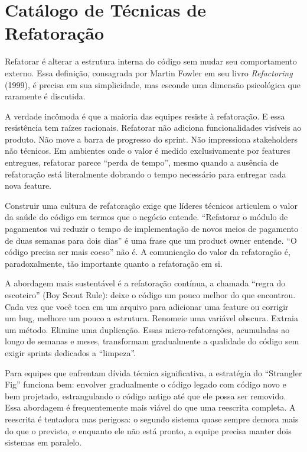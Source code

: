 \section{Catálogo de Técnicas de Refatoração}

Refatorar é alterar a estrutura interna do código sem mudar seu comportamento
externo. Essa definição, consagrada por Martin Fowler em seu livro
\emph{Refactoring} (1999), é precisa em sua simplicidade, mas esconde uma
dimensão psicológica que raramente é discutida.

A verdade incômoda é que a maioria das equipes resiste à refatoração. E essa
resistência tem raízes racionais. Refatorar não adiciona funcionalidades
visíveis ao produto. Não move a barra de progresso do sprint. Não impressiona
stakeholders não técnicos. Em ambientes onde o valor é medido exclusivamente
por features entregues, refatorar parece ``perda de tempo'', mesmo quando
a ausência de refatoração está literalmente dobrando o tempo necessário para
entregar cada nova feature.

Construir uma cultura de refatoração exige que líderes técnicos articulem
o valor da saúde do código em termos que o negócio entende. ``Refatorar o
módulo de pagamentos vai reduzir o tempo de implementação de novos meios
de pagamento de duas semanas para dois dias'' é uma frase que um product
owner entende. ``O código precisa ser mais coeso'' não é. A comunicação do
valor da refatoração é, paradoxalmente, tão importante quanto a refatoração
em si.

A abordagem mais sustentável é a refatoração contínua, a chamada ``regra
do escoteiro'' (Boy Scout Rule): deixe o código um pouco melhor do que
encontrou. Cada vez que você toca em um arquivo para adicionar uma feature
ou corrigir um bug, melhore um pouco a estrutura. Renomeie uma variável
obscura. Extraia um método. Elimine uma duplicação. Essas micro-refatorações,
acumuladas ao longo de semanas e meses, transformam gradualmente a qualidade
do código sem exigir sprints dedicados a ``limpeza''.

Para equipes que enfrentam dívida técnica significativa, a estratégia do
``Strangler Fig'' funciona bem: envolver gradualmente o código legado com código novo
e bem projetado, estrangulando o código antigo até que ele possa ser removido.
Essa abordagem é frequentemente mais viável do que uma reescrita completa. A reescrita
é tentadora mas perigosa: o segundo sistema quase sempre demora mais do que
o previsto, e enquanto ele não está pronto, a equipe precisa manter dois
sistemas em paralelo.

